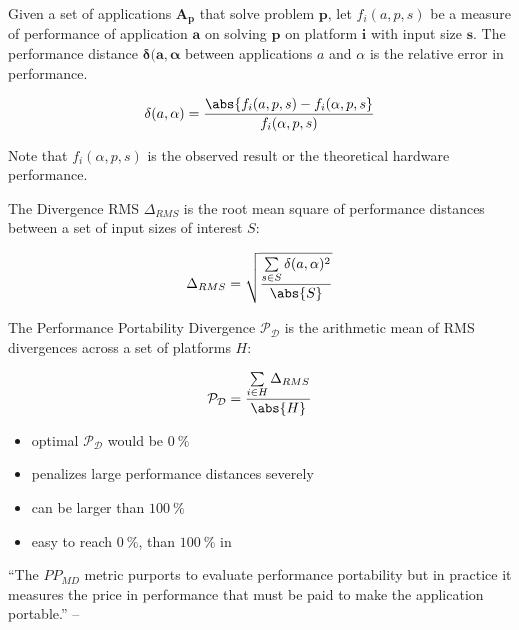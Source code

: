 \begin{definition}\label{def:perf_dist}
Given a set of applications $\mathbf{A_p}$ that solve problem $\mathbf{p}$, let $f_i(a, p, s)$ be a measure of performance of application $\mathbf{a}$ on solving $\mathbf{p}$ on platform $\mathbf{i}$ with input size $\mathbf{s}$. 
The performance distance $\mathbf{\delta(a, \alpha}$ between applications $a$ and $\alpha$ is the relative error in performance.

$$\delta(a, \alpha) = \frac{\abs{f_i(a, p, s) - f_i(\alpha, p, s}}{f_i(\alpha, p, s)}$$

Note that $f_i(\alpha, p, s)$ is the observed result or the theoretical hardware performance. 
\end{definition}

\begin{definition}\label{def:div_rms}
The Divergence RMS $\Delta_{RMS}$ is the root mean square of performance distances between a set of input sizes of interest $S$:

$$\Delta_{RMS} = \sqrt{\frac{\sum\limits_{s \in S} \delta(a, \alpha)^2}{\abs{S}}}$$

\end{definition}

\begin{definition}\label{def:pp_div}
The Performance Portability Divergence $\mathcal{P_D}$ is the arithmetic mean of RMS divergences across a set of platforms $H$:

$$\mathcal{P_D} = \frac{\sum\limits_{i \in H} \Delta_{RMS}}{\abs{H}}$$

\end{definition}

\begin{itemize}
    \item optimal $\mathcal{P_D}$ would be $\SI{0}{\percent}$
    \item penalizes large performance distances severely
    \item can be larger than $\SI{100}{\percent}$
    \item easy to reach $\SI{0}{\percent}$, than $\SI{100}{\percent}$ in \pp
\end{itemize}

\newpage
\cite{sedova_high-performance_2018}

\enquote{The $PP_{MD}$ metric purports to evaluate performance portability but in practice it measures the price in performance that must be paid to make the application portable.} -- \cite{marowka_comparison_2023}

